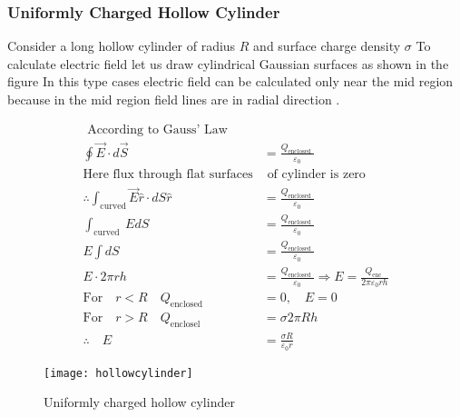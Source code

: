 \subsubsection{Uniformly Charged Hollow Cylinder}
Consider a long hollow cylinder of radius $R$ and surface charge density $\sigma$ To calculate electric field let us draw cylindrical Gaussian surfaces as shown in the figure In this type cases electric field can be calculated only near the mid region because in the mid region field lines are in radial direction .\\
\begin{minipage}{0.75\textwidth}
\begin{align*}
\text{ According to Gauss' Law}\\
\oint \vec{E} \cdot d \vec{S}&=\frac{Q_{\text {enclosed }}}{\varepsilon_{0}}\\
\text{Here flux through flat surfaces}&\text{  of cylinder is zero}\\
\therefore \int_\text{curved} \vec{E} \hat{r} \cdot d S \hat{r}&=\frac{Q_{\text {enclosed }}}{\varepsilon_{0}}\\
\int_{\text {curved }} E d S&=\frac{Q_{\text {enclosed }}}{\varepsilon_{0}} \\
E \int dS&=\frac{Q_{\text {enclosed }}}{\varepsilon_{0}} \\
E \cdot 2 \pi r h&=\frac{Q_{\text {enclosed }}}{\varepsilon_{0}} \Rightarrow  E=\frac{Q_{\text {enc }}}{2 \pi \varepsilon_{0} r h}\\
\text{For}\quad r<R \quad Q_{\text {enclosed }}&=0, \quad E=0\\
\text{For}\quad r>R \quad Q_{\text {enclosel }}&=\sigma 2 \pi R h\\
\therefore \quad E&=\frac{\sigma R}{\varepsilon_{0} r}
\end{align*}
\end{minipage}
\begin{minipage}{0.25\textwidth}\hfil
	\begin{figure}[H]
		\texttt{[image: hollowcylinder]}
		\caption{Uniformly charged hollow cylinder}
	\end{figure}
\end{minipage}
